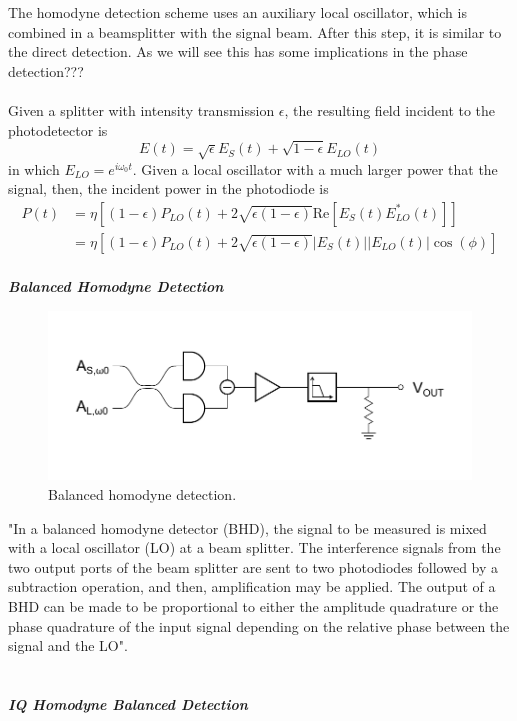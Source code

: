 The homodyne detection scheme uses an auxiliary local oscillator, which is combined in
a beamsplitter with the signal beam. After this step, it is similar to the direct detection. As we will see this has some implications in the phase detection???\\
\\
Given a splitter with intensity transmission $\epsilon$, the resulting field incident to the photodetector is
\cite{shapiro1985quantum} %
%
\begin{equation}
	E(t) = \sqrt{\epsilon}E_S(t) + \sqrt{1-\epsilon}E_{LO}(t)
\end{equation}
%
in which $E_{LO} = e^{i \omega_0 t}$.
Given a local oscillator with a much larger power that the signal, then, the incident power in the photodiode is
%
\begin{align}
	P(t)	&= \eta \left[ (1-\epsilon) P_{LO}(t) + 2 \sqrt{\epsilon (1-\epsilon)} \textrm{Re} \left[ E_S(t) E^\ast_{LO}(t) \right] \right]\\
			&= \eta \left[ (1-\epsilon) P_{LO}(t) + 2 \sqrt{\epsilon (1-\epsilon)} |E_S(t)| |E_{LO}(t)| \cos{(\phi)} \right]\\
\end{align}

{\bf \em Balanced Homodyne Detection}\\
%
%

\begin{figure}[H]
	\centering
	\includegraphics{./sdf/optical_detection/figures/detection-balanced-homodyne.pdf}
	\caption{Balanced homodyne detection.}
\end{figure}
"In a balanced homodyne detector (BHD), the signal to be measured is mixed with a local oscillator (LO) at a beam splitter. The interference signals from the two output ports of the beam splitter are sent to two photodiodes followed by a subtraction operation, and then, amplification may be applied. The output of a BHD can be made to be proportional to either the amplitude quadrature or the phase quadrature of the input signal depending on the relative phase between the signal and the LO".
\\
\\
\\
{\bf \em IQ Homodyne Balanced Detection}\\


